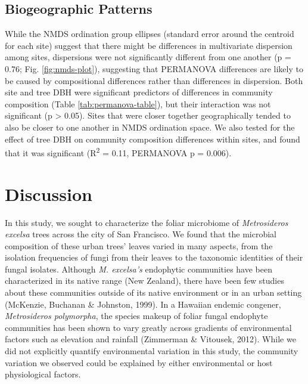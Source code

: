 \documentclass[fleqn,10pt,lineno]{wlpeerj} %
\begin{document}
\hypertarget{biogeographic-patterns}{%
\subsection*{Biogeographic Patterns}\label{biogeographic-patterns}}

While the NMDS ordination group ellipses (standard error around the centroid for each site) suggest that there might be differences in multivariate dispersion among sites, dispersions were not significantly different from one another (p = 0.76; Fig. \ref{fig:nmds-plot}), suggesting that PERMANOVA differences are likely to be caused by compositional differences rather than differences in dispersion. Both site and tree DBH were significant predictors of differences in community composition (Table \ref{tab:permanova-table}), but their interaction was not significant (p \textgreater{} 0.05). Sites that were closer together geographically tended to also be closer to one another in NMDS ordination space. We also tested for the effect of tree DBH on community composition differences within sites, and found that it was significant (R\textsuperscript{2} = 0.11, PERMANOVA p = 0.006).

\hypertarget{discussion}{%
\section*{Discussion}\label{discussion}}

In this study, we sought to characterize the foliar microbiome of \emph{Metrosideros excelsa} trees across the city of San Francisco. We found that the microbial composition of these urban trees' leaves varied in many aspects, from the isolation frequencies of fungi from their leaves to the taxonomic identities of their fungal isolates. Although \emph{M. excelsa's} endophytic communities have been characterized in its native range (New Zealand), there have been few studies about these communities outside of its native environment or in an urban setting (McKenzie, Buchanan \& Johnston, 1999). In a Hawaiian endemic congener, \emph{Metrosideros polymorpha}, the species makeup of foliar fungal endophyte communities has been shown to vary greatly across gradients of environmental factors such as elevation and rainfall (Zimmerman \& Vitousek, 2012). While we did not explicitly quantify environmental variation in this study, the community variation we observed could be explained by either environmental or host physiological factors.
\end{document}

